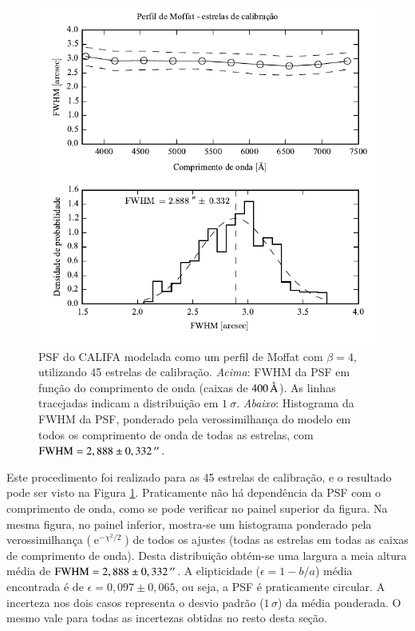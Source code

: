 
\begin{figure}
	\includegraphics{figuras/PSFMoffatBeta4_calib}
	\caption[PSF do CALIFA -- estrelas de calibração]
	{PSF do CALIFA modelada como um perfil de Moffat com $\beta=4$, utilizando 45
	estrelas de calibração. {\em Acima}: FWHM da PSF em função do comprimento de
	onda (caixas de $400\,\text{\normalfont\AA}$). As linhas tracejadas indicam a distribuição
	em $1\ \sigma$. {\em Abaixo}: Histograma da FWHM da PSF, ponderado pela
	verossimilhança do modelo em todos os comprimento de onda de todas as estrelas,
	com $\mathrm{FWHM}=2,888 \pm 0,332\,^{\prime\prime}$.}
	\label{fig:PSFCalib}
\end{figure}

Este procedimento foi realizado para as 45 estrelas de calibração, e o resultado
pode ser visto na Figura \ref{fig:PSFCalib}. Praticamente não há dependência da
PSF com o comprimento de onda, como se pode verificar no painel superior da
figura. Na mesma figura, no painel inferior, mostra-se um histograma ponderado
pela verossimilhança ($\operatorname{e}^{-\chi^2/2}$) de todos os ajustes (todas
as estrelas em todas as caixas de comprimento de onda). Desta distribuição
obtém-se uma largura a meia altura média de $\mathrm{FWHM} = 2,888 \pm
0,332\,^{\prime\prime}$. A elipticidade ($\epsilon = 1 - b/a$) média encontrada é de
$\epsilon = 0,097 \pm 0,065$, ou seja, a PSF é praticamente circular. A
incerteza nos dois casos representa o desvio padrão ($1\,\sigma$) da média
ponderada. O mesmo vale para todas as incertezas obtidas no resto desta seção.

